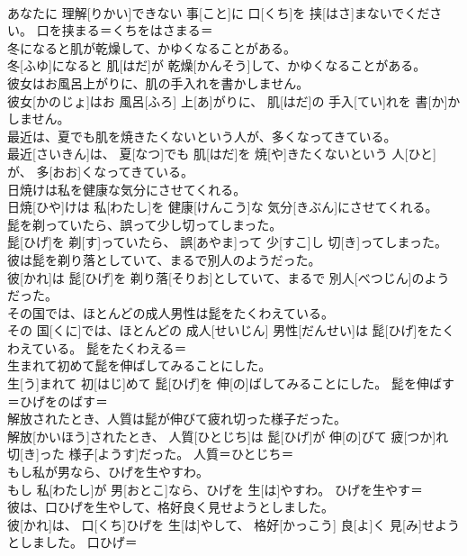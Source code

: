 \documentclass[8pt]{extreport}
\begin{document}
\begin{CJK}{UTF8}{min}
\\	あなたに 理解[りかい]できない 事[こと]に 口[くち]を 挟[はさ]まないでください。	口を挟まる＝くちをはさまる＝ 
\\	冬になると肌が乾燥して、かゆくなることがある。	
\\	冬[ふゆ]になると 肌[はだ]が 乾燥[かんそう]して、かゆくなることがある。	
\\	彼女はお風呂上がりに、肌の手入れを書かしません。	
\\	彼女[かのじょ]はお 風呂[ふろ] 上[あ]がりに、 肌[はだ]の 手入[てい]れを 書[か]かしません。	
\\	最近は、夏でも肌を焼きたくないという人が、多くなってきている。	
\\	最近[さいきん]は、 夏[なつ]でも 肌[はだ]を 焼[や]きたくないという 人[ひと]が、 多[おお]くなってきている。	
\\	日焼けは私を健康な気分にさせてくれる。	
\\	日焼[ひや]けは 私[わたし]を 健康[けんこう]な 気分[きぶん]にさせてくれる。	
\\	髭を剃っていたら、誤って少し切ってしまった。	
\\	髭[ひげ]を 剃[す]っていたら、 誤[あやま]って 少[すこ]し 切[き]ってしまった。	
\\	彼は髭を剃り落としていて、まるで別人のようだった。	
\\	彼[かれ]は 髭[ひげ]を 剃り落[そりお]としていて、まるで 別人[べつじん]のようだった。	
\\	その国では、ほとんどの成人男性は髭をたくわえている。	
\\	その 国[くに]では、ほとんどの 成人[せいじん] 男性[だんせい]は 髭[ひげ]をたくわえている。	髭をたくわえる＝ 
\\	生まれて初めて髭を伸ばしてみることにした。	
\\	生[う]まれて 初[はじ]めて 髭[ひげ]を 伸[の]ばしてみることにした。	髭を伸ばす＝ひげをのばす＝ 
\\	解放されたとき、人質は髭が伸びて疲れ切った様子だった。	
\\	解放[かいほう]されたとき、 人質[ひとじち]は 髭[ひげ]が 伸[の]びて 疲[つか]れ 切[き]った 様子[ようす]だった。	人質＝ひとじち＝ 
\\	もし私が男なら、ひげを生やすわ。	
\\	もし 私[わたし]が 男[おとこ]なら、ひげを 生[は]やすわ。	ひげを生やす＝ 
\\	彼は、口ひげを生やして、格好良く見せようとしました。	
\\	彼[かれ]は、 口[くち]ひげを 生[は]やして、 格好[かっこう] 良[よ]く 見[み]せようとしました。	口ひげ＝ 

\end{CJK}
\end{document}
